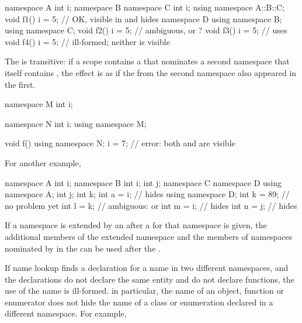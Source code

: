 \begin{codeblock}
namespace A {
	int i;
	namespace B {
		namespace C {
			int i;
		}
		using namespace A::B::C;
		void f1() {
			i = 5;		// OK,  visible in  and hides 
		}
	}
	namespace D {
		using namespace B;
		using namespace C;
		void f2() {
			i = 5;		// ambiguous,  or ?
		}
	}
	void f3() {
		i = 5;		// uses 
	}
}
void f4() {
	i = 5;			// ill-formed; neither  is visible
}
\end{codeblock}
\exitexample

\pnum
The  is transitive: if a scope contains a
 that nominates a second namespace that itself
contains , the effect is as if the
 from the second namespace also appeared in
the first.
\enterexample

\begin{codeblock}
namespace M {
	int i;
}

namespace N {
	int i;
	using namespace M;
}

void f()
{
	using namespace N;
	i = 7;			// error: both  and  are visible
}
\end{codeblock}

For another example,

\begin{codeblock}
namespace A {
	int i;
}
namespace B {
	int i;
	int j;
	namespace C {
		namespace D {
			using namespace A;
			int j;
			int k;
			int a = i;	//  hides 
		}
		using namespace D;
		int k = 89;	// no problem yet
		int l = k;	// ambiguous:  or 
		int m = i;	//  hides 
		int n = j;	//  hides 
	}
}
\end{codeblock}
\exitexampleb

\pnum
If a namespace is extended by an
 after a
 for that namespace is given, the additional
members of the extended namespace and the members of namespaces
nominated by  in the
 can be used after the
.

\pnum
If name lookup finds a declaration for a name in two different
namespaces, and the declarations do not declare the same entity and do
not declare functions, the use of the name is ill-formed.
\enternote
in particular, the name of an object, function or enumerator does not
hide the name of a class or enumeration declared in a different
namespace. For example,

